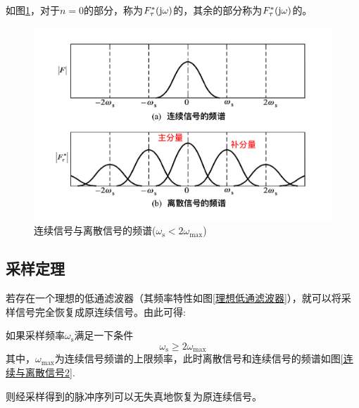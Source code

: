如图\ref{连续与离散信号}，对于$n = 0$的部分，称为$F_\tau^*(\text{j} \omega)$的，其余的部分称为$F_\tau^*(\text{j} \omega)$的。
\vspace*{-1em}
\begin{figure}[!htb]
	\centering
	\includegraphics[width=0.7\linewidth]{pic/连续与离散信号.jpg}
	\vspace*{-2em}
	\caption{连续信号与离散信号的频谱($\omega_{\text{s}} < 2 \omega_\max$)}
	\label{连续与离散信号}
\end{figure}

\subsection{采样定理}
若存在一个理想的低通滤波器（其频率特性如图\ref{理想低通滤波器}），就可以将采样信号完全恢复成原连续信号。由此可得:

如果采样频率$\omega_{\text{s}}$满足一下条件
\begin{equation}
	\omega_{\text{s}} \ge 2\omega_{\max}
\end{equation}
其中，$\omega_\max$为连续信号频谱的上限频率，此时离散信号和连续信号的频谱如图\ref{连续与离散信号2}.

则经采样得到的脉冲序列可以无失真地恢复为原连续信号。

